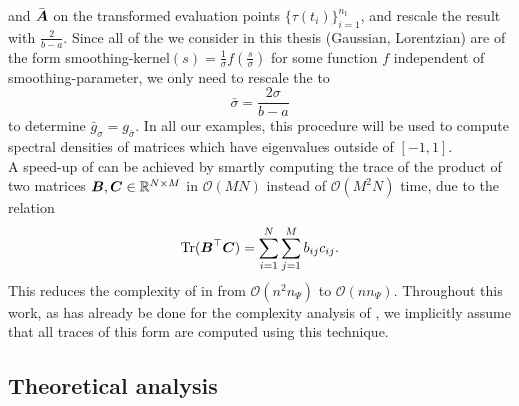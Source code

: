 and $\bar{\boldsymbol{A}}$ on the transformed evaluation points $\{ \tau(t_i) \}_{i=1}^{n_t}$,
and rescale the result with $\frac{2}{b-a}$.
Since all of the  we consider in this thesis (Gaussian, Lorentzian) are of the form
\gls{smoothing-kernel}$(s)=\frac{1}{\sigma}f(\frac{s}{\sigma})$ for some function $f$ independent of
\gls{smoothing-parameter}, we only need to rescale the  to
\begin{equation}
    \bar{\sigma} = \frac{2\sigma}{b - a}
    \label{equ:2-chebyshev-sigma-transformation}
\end{equation}
to determine $\bar{g}_{\sigma}=g_{\bar{\sigma}}$.
In all our examples, this procedure will be used to compute spectral densities
of matrices which have eigenvalues outside of $[-1, 1]$.\\

A speed-up of  can be achieved by smartly computing the trace of the 
product of two matrices $\boldsymbol{B}, \boldsymbol{C} \in \mathbb{R}^{N \times M}$ in
$\mathcal{O}(MN)$ instead of $\mathcal{O}(M^2N)$ time, due to the relation
\begin{equation}
    \operatorname{Tr}(\boldsymbol{B}^{\top}\boldsymbol{C}) = \sum_{i=1}^{N} \sum_{j=1}^{M} b_{ij} c_{ij}.
    \label{equ:2-chebyshev-fast-trace}
\end{equation}
This reduces the complexity of 
in  from $\mathcal{O}(n^2n_{\Psi})$ to $\mathcal{O}(nn_{\Psi})$.
Throughout this work, as has already be done for the complexity analysis
of , we implicitly assume that all traces of this
form are computed using this technique.

\subsection{Theoretical analysis}
\label{subsec:2-chebyshev-theoretical-analysis}

